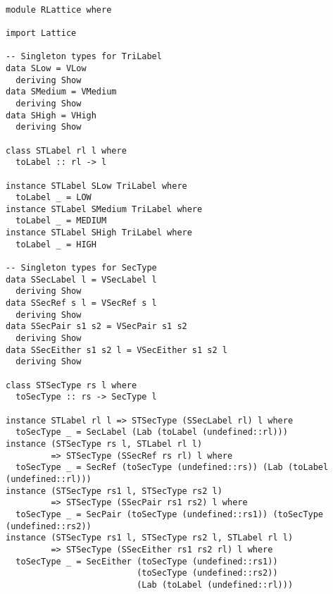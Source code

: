 \begin{Verbatim}[fontsize=\footnotesize,frame=lines,
                 framesep=5mm, label={[RLattice.hs]RLattice.hs}]

module RLattice where

import Lattice

-- Singleton types for TriLabel
data SLow = VLow
  deriving Show
data SMedium = VMedium
  deriving Show
data SHigh = VHigh
  deriving Show

class STLabel rl l where
  toLabel :: rl -> l 

instance STLabel SLow TriLabel where
  toLabel _ = LOW
instance STLabel SMedium TriLabel where
  toLabel _ = MEDIUM
instance STLabel SHigh TriLabel where
  toLabel _ = HIGH

-- Singleton types for SecType
data SSecLabel l = VSecLabel l
  deriving Show
data SSecRef s l = VSecRef s l
  deriving Show
data SSecPair s1 s2 = VSecPair s1 s2
  deriving Show
data SSecEither s1 s2 l = VSecEither s1 s2 l
  deriving Show

class STSecType rs l where
  toSecType :: rs -> SecType l

instance STLabel rl l => STSecType (SSecLabel rl) l where
  toSecType _ = SecLabel (Lab (toLabel (undefined::rl)))
instance (STSecType rs l, STLabel rl l)
         => STSecType (SSecRef rs rl) l where
  toSecType _ = SecRef (toSecType (undefined::rs)) (Lab (toLabel (undefined::rl)))
instance (STSecType rs1 l, STSecType rs2 l) 
         => STSecType (SSecPair rs1 rs2) l where
  toSecType _ = SecPair (toSecType (undefined::rs1)) (toSecType (undefined::rs2))
instance (STSecType rs1 l, STSecType rs2 l, STLabel rl l)
         => STSecType (SSecEither rs1 rs2 rl) l where
  toSecType _ = SecEither (toSecType (undefined::rs1)) 
                          (toSecType (undefined::rs2)) 
                          (Lab (toLabel (undefined::rl)))

\end{Verbatim}
